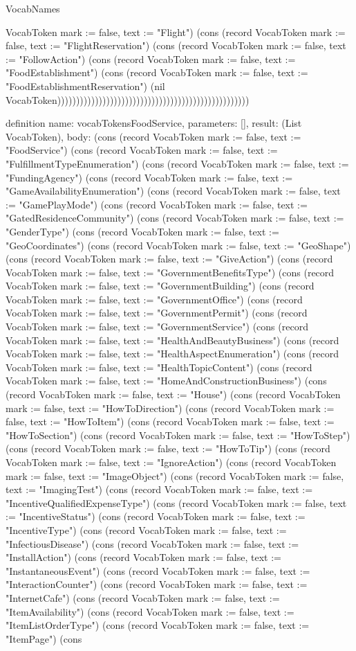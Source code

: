 \begin{lexlean}{VocabNames}
\begin{semanticmodule}
{VocabToken {mark := false, text := "Flight"}) (cons (record VocabToken {mark := false, text := "FlightReservation"}) (cons (record VocabToken {mark := false, text := "FollowAction"}) (cons (record VocabToken {mark := false, text := "FoodEstablishment"}) (cons (record VocabToken {mark := false, text := "FoodEstablishmentReservation"}) (nil VocabToken)))))))))))))))))))))))))))))))))))))))))))))))))))
}

definition{
  name: vocabTokensFoodService,
  parameters: [],
  result: (List VocabToken),
  body: (cons (record VocabToken {mark := false, text := "FoodService"}) (cons (record VocabToken {mark := false, text := "FulfillmentTypeEnumeration"}) (cons (record VocabToken {mark := false, text := "FundingAgency"}) (cons (record VocabToken {mark := false, text := "GameAvailabilityEnumeration"}) (cons (record VocabToken {mark := false, text := "GamePlayMode"}) (cons (record VocabToken {mark := false, text := "GatedResidenceCommunity"}) (cons (record VocabToken {mark := false, text := "GenderType"}) (cons (record VocabToken {mark := false, text := "GeoCoordinates"}) (cons (record VocabToken {mark := false, text := "GeoShape"}) (cons (record VocabToken {mark := false, text := "GiveAction"}) (cons (record VocabToken {mark := false, text := "GovernmentBenefitsType"}) (cons (record VocabToken {mark := false, text := "GovernmentBuilding"}) (cons (record VocabToken {mark := false, text := "GovernmentOffice"}) (cons (record VocabToken {mark := false, text := "GovernmentPermit"}) (cons (record VocabToken {mark := false, text := "GovernmentService"}) (cons (record VocabToken {mark := false, text := "HealthAndBeautyBusiness"}) (cons (record VocabToken {mark := false, text := "HealthAspectEnumeration"}) (cons (record VocabToken {mark := false, text := "HealthTopicContent"}) (cons (record VocabToken {mark := false, text := "HomeAndConstructionBusiness"}) (cons (record VocabToken {mark := false, text := "House"}) (cons (record VocabToken {mark := false, text := "HowToDirection"}) (cons (record VocabToken {mark := false, text := "HowToItem"}) (cons (record VocabToken {mark := false, text := "HowToSection"}) (cons (record VocabToken {mark := false, text := "HowToStep"}) (cons (record VocabToken {mark := false, text := "HowToTip"}) (cons (record VocabToken {mark := false, text := "IgnoreAction"}) (cons (record VocabToken {mark := false, text := "ImageObject"}) (cons (record VocabToken {mark := false, text := "ImagingTest"}) (cons (record VocabToken {mark := false, text := "IncentiveQualifiedExpenseType"}) (cons (record VocabToken {mark := false, text := "IncentiveStatus"}) (cons (record VocabToken {mark := false, text := "IncentiveType"}) (cons (record VocabToken {mark := false, text := "InfectiousDisease"}) (cons (record VocabToken {mark := false, text := "InstallAction"}) (cons (record VocabToken {mark := false, text := "InstantaneousEvent"}) (cons (record VocabToken {mark := false, text := "InteractionCounter"}) (cons (record VocabToken {mark := false, text := "InternetCafe"}) (cons (record VocabToken {mark := false, text := "ItemAvailability"}) (cons (record VocabToken {mark := false, text := "ItemListOrderType"}) (cons (record VocabToken {mark := false, text := "ItemPage"}) (cons }
\end{semanticmodule}
\end{lexlean}
